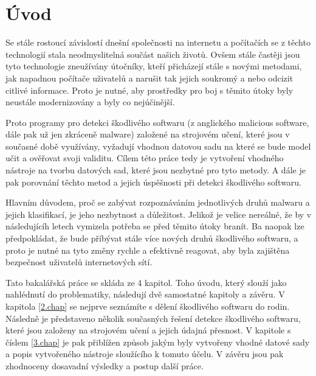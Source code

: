 
%

\chapter{Úvod}

Se stále rostoucí závislostí dnešní společnosti na internetu a počítačích se z těchto technologií stala neodmyslitelná součást našich životů. 
Ovšem stále častěji jsou tyto technologie zneužívány útočníky, kteří přicházejí stále s novými metodami, jak napadnou počítače uživatelů a narušit tak jejich soukromý a nebo odcizit citlivé informace.
Proto je nutné, aby prostředky pro boj s těmito útoky byly neustále modernizovány a byly co nejúčinější.

Proto programy pro detekci škodlivého softwaru (z anglického malicious software, dále pak už jen zkráceně malware) založené na strojovém učení, které jsou v současné době využívány, vyžadují vhodnou datovou sadu na které se bude model učit a ověřovat svoji validitu.
Cílem této práce tedy je vytvoření vhodného nástroje na tvorbu datových sad, které jsou nezbytné pro tyto metody. %
A dále je pak porovnání těchto metod a jejich úspěšnosti při detekci škodlivého softwaru.

Hlavním důvodem, proč se zabývat rozpoznáváním jednotlivých druhů malwaru a jejich klasifikací, je jeho nezbytnost a důležitost.
Jelikož je velice nereálné, že by v následujícíh letech vymizela potřeba se před těmito útoky branít. Ba naopak lze předpokládat, že 
bude příbývat stále více nových druhů škodlivého softwaru, a proto je nutné na tyto změny rychle a efektivně reagovat, aby byla zajištěna
bezpečnost uživatelů internetových sítí.

Tato bakalářská práce se skláda ze 4 kapitol. Toho úvodu, který slouží jako nahlédnutí do problematiky, následují dvě samostatné kapitoly a závěru. V kapitola \ref{2.chap} se nejprve seznámíte s dělení škodlivého softwaru do rodin. Následně
je představeno několik současných řešení detekce škodlivého softwaru, které jsou založeny na strojovém učení a jejich údajná přesnost.
V kapitole s číslem \ref{3.chap} je pak přiblížen způsob jakým byly vytvořeny vhodné datové sady a popis vytvořeného nástroje sloužícího k tomuto účelu. V závěru jsou pak zhodnoceny dosavadní výsledky a postup další práce.

